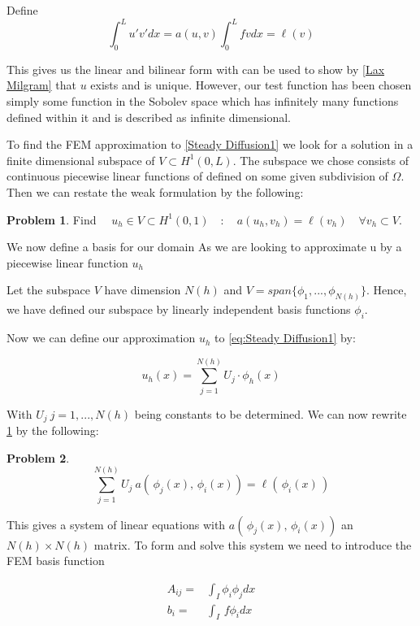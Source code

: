 \documentclass{uonmathreport}
\theoremstyle{definition}
\theoremstyle{problem}
\newtheorem{problem}{Problem}[section]
\theoremstyle{theorem}
\begin{document}
Define 
\begin{equation*}
\int_0^L  u' v'  dx = a(u, v)  	
\int_0^L  f v dx  =  \ell(v)
\end{equation*}

This gives us the linear and bilinear form with can be used to show by \ref{Lax Milgram} that $u$ exists and is unique. However, our test function has been chosen simply some function in the Sobolev space which has infinitely many functions defined within it and is described as infinite dimensional. 

To find the FEM approximation to \ref{Steady Diffusion1} we look for a solution in a finite dimensional subspace of $V\subset H^1(0, L) $. The subspace we chose consists of continuous piecewise linear functions of defined on some given subdivision of $\Omega$. Then we can restate the weak formulation by the following:

\begin{problem} \label{prob:Approx1}
Find $\quad u_h \in  V\subset H^1(0, 1) \quad : \quad a(u_h, v_h) =  \ell(v_h) \quad \forall v_h \subset V.$
\end{problem}

We now define a basis for our domain 
As we are looking to approximate u by a piecewise linear function $u_h$ 

Let the subspace $V$ have dimension $N(h)$ and $V = span\{\phi_1, ..., \phi_{N(h)}\}$. Hence, we have defined our subspace by linearly independent basis functions $\phi_i$.

Now we can define our approximation $u_h$ to \ref{eq:Steady Diffusion1} by:

\begin{equation*}
u_h(x) = \sum_{j=1}^{N(h)} U_j \cdot \phi_h(x)
\end{equation*}

With $U_j \: j = 1, ..., N(h)$ being constants to be determined. We can now rewrite \ref{prob:Approx1} by the following:

\begin{problem}
$$\sum_{j=1}^{N(h)}U_j \: a( \,\phi_j(x),\, \phi_i(x)) = \ell(\,\phi_i(x)\,) $$
\end{problem}

This gives a system of linear equations with $a( \,\phi_j(x),\, \phi_i(x))$ an $N(h)\times N(h)$ matrix. To form and solve this system we need to introduce the FEM basis function 

\begin{subequations} 
\begin{align}
A_{ij} =& \int_I \phi_i \phi_j dx \label{eq:stiff}\\
b_i =& \int_I  \, f\phi_i dx
\end{align}
\end{subequations}
\end{document}
